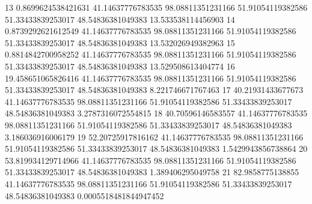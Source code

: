 {13 0.8699624538421631 41.14637776783535 98.08811351231166 51.91054119382586 51.33433839253017 48.54836381049383 13.533538114456903
14 0.8739292621612549 41.14637776783535 98.08811351231166 51.91054119382586 51.33433839253017 48.54836381049383 13.532026949382963
15 0.8814842700958252 41.14637776783535 98.08811351231166 51.91054119382586 51.33433839253017 48.54836381049383 13.529508613404774
16 19.458651065826416 41.14637776783535 98.08811351231166 51.91054119382586 51.33433839253017 48.54836381049383 8.221746671767463
17 40.21931433677673 41.14637776783535 98.08811351231166 51.91054119382586 51.33433839253017 48.54836381049383 3.2787316072554815
18 40.70596146583557 41.14637776783535 98.08811351231166 51.91054119382586 51.33433839253017 48.54836381049383 3.186036916006179
19 52.20725917816162 41.14637776783535 98.08811351231166 51.91054119382586 51.33433839253017 48.54836381049383 1.5429943856738864
20 53.819934129714966 41.14637776783535 98.08811351231166 51.91054119382586 51.33433839253017 48.54836381049383 1.389406295049758
21 82.9858775138855 41.14637776783535 98.08811351231166 51.91054119382586 51.33433839253017 48.54836381049383 0.0005518481844947452
}\tableexpivwaitaicodeexc
